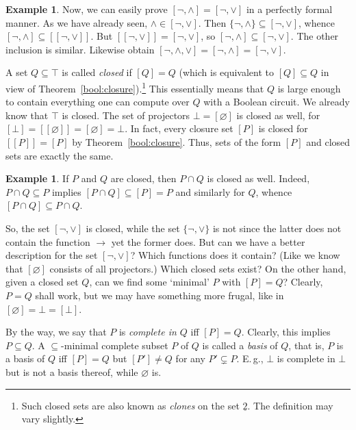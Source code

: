 \documentclass[12pt,notitlepage]{article}
\theoremstyle{plain}
\theoremstyle{definition}
\newtheorem{exm}[thm]{Example}
\theoremstyle{plain}
\newcommand{\sbs}{\subseteq}
\newcommand{\void}{\varnothing}
\newcommand{\ul}[1]{\underline{#1}}
\newcommand{\1}{\mathbf{1}}
\newcommand{\0}{\mathbf{0}}
\begin{document}
\begin{exm}
Now, we can easily prove $[{\neg}, {\wedge}] = [{\neg}, {\vee}]$ in a perfectly formal manner. As we have already seen, $\wedge \in [{\neg}, {\vee}]$. Then $\{ {\neg}, {\wedge} \} \sbs [{\neg}, {\vee}]$, whence $[{\neg}, {\wedge}] \sbs [[{\neg}, {\vee}]]$. But $[[{\neg}, {\vee}]] = [{\neg}, {\vee}]$, so $[{\neg}, {\wedge}] \sbs [{\neg}, {\vee}]$. The other inclusion is similar. Likewise obtain $[{\neg}, {\wedge}, {\vee}] = [{\neg}, {\wedge}] = [{\neg}, {\vee}]$.
\end{exm}

A set $Q \sbs \top$ is called \emph{closed} if $[Q] = Q$ (which is equivalent to $[Q] \sbs Q$ in view of Theorem~\ref{bool:closure}).\footnote{Such closed sets are also known as \emph{clones} on the set $\ul{2}$. The definition may vary slightly.} This essentially means that $Q$ is large enough to contain everything one can compute over $Q$ with a Boolean circuit. We already know that $\top$ is closed. The set of projectors $\bot = [\void]$ is closed as well, for $[\bot] = [[\void]] = [\void] = \bot$. In fact, every closure set $[P]$ is closed for $[[P]] = [P]$ by Theorem~\ref{bool:closure}. Thus, sets of the form $[P]$ and closed sets are exactly the same.

\begin{exm}\label{bool:clone_cap}
If $P$ and $Q$ are closed, then $P \cap Q$ is closed as well. Indeed, $P \cap Q \sbs P$ implies $[P \cap Q] \sbs [P] = P$ and similarly for $Q$, whence $[P \cap Q] \sbs P \cap Q$.
\end{exm}

So, the set $[{\neg}, {\vee}]$ is closed, while the set $\{ {\neg}, {\vee} \}$ is not since the latter does not contain the function ${\to}$ yet the former does. But can we have a better description for the set $[{\neg}, {\vee}]$? Which functions does it contain? (Like we know that $[\void]$ consists of all projectors.) Which closed sets exist? On the other hand, given a closed set $Q$, can we find some `minimal' $P$ with $[P] = Q$? Clearly, $P = Q$ shall work, but we may have something more frugal, like in $[\void] = \bot = [\bot]$.

By the way, we say that $P$ is \emph{complete in $Q$} iff $[P] = Q$. Clearly, this implies $P \sbs Q$. A $\sbs$-minimal complete subset $P$ of $Q$ is called a \emph{basis} of $Q$, that is, $P$ is a basis of $Q$ iff $[P] = Q$ but $[P'] \neq Q$ for any $P' \subsetneq P$. E.\,g., $\bot$ is complete in $\bot$ but is not a basis thereof, while $\void$ is.
\end{document}
